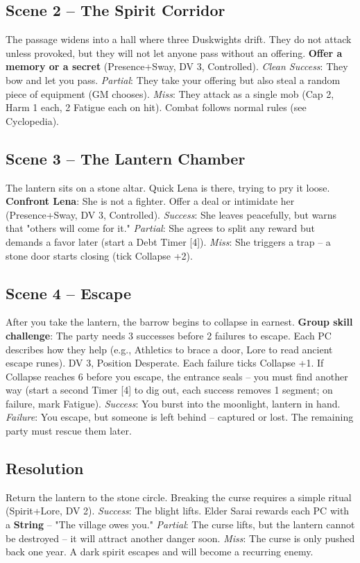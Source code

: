 \documentclass[10pt, twocolumn]{article}
\begin{document}
\subsection*{Scene 2 -- The Spirit Corridor}
The passage widens into a hall where three Duskwights drift. They do not attack unless provoked, but they will not let anyone pass without an offering.  
\textbf{Offer a memory or a secret} (Presence+Sway, DV 3, Controlled).  
\textit{Clean Success}: They bow and let you pass.  
\textit{Partial}: They take your offering but also steal a random piece of equipment (GM chooses).  
\textit{Miss}: They attack as a single mob (Cap 2, Harm 1 each, 2 Fatigue each on hit). Combat follows normal rules (see Cyclopedia).

\subsection*{Scene 3 -- The Lantern Chamber}
The lantern sits on a stone altar. Quick Lena is there, trying to pry it loose.  
\textbf{Confront Lena}: She is not a fighter. Offer a deal or intimidate her (Presence+Sway, DV 3, Controlled).  
\textit{Success}: She leaves peacefully, but warns that "others will come for it."  
\textit{Partial}: She agrees to split any reward but demands a favor later (start a Debt Timer [4]).  
\textit{Miss}: She triggers a trap -- a stone door starts closing (tick Collapse +2).

\subsection*{Scene 4 -- Escape}
After you take the lantern, the barrow begins to collapse in earnest.  
\textbf{Group skill challenge}: The party needs 3 successes before 2 failures to escape. Each PC describes how they help (e.g., Athletics to brace a door, Lore to read ancient escape runes). DV 3, Position Desperate.  
Each failure ticks Collapse +1. If Collapse reaches 6 before you escape, the entrance seals -- you must find another way (start a second Timer [4] to dig out, each success removes 1 segment; on failure, mark Fatigue).  
\textit{Success}: You burst into the moonlight, lantern in hand.  
\textit{Failure}: You escape, but someone is left behind -- captured or lost. The remaining party must rescue them later.

\subsection*{Resolution}
Return the lantern to the stone circle. Breaking the curse requires a simple ritual (Spirit+Lore, DV 2).  
\textit{Success}: The blight lifts. Elder Sarai rewards each PC with a \textbf{String} -- "The village owes you."  
\textit{Partial}: The curse lifts, but the lantern cannot be destroyed -- it will attract another danger soon.  
\textit{Miss}: The curse is only pushed back one year. A dark spirit escapes and will become a recurring enemy.
\end{document}
